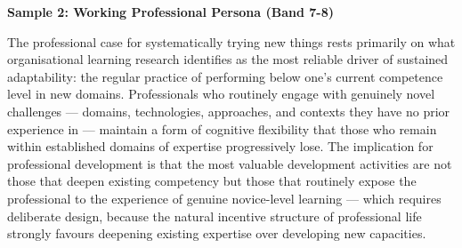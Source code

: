 \textbf{Sample 2: Working Professional Persona (Band 7-8)}

The professional case for systematically trying new things rests primarily on what organisational learning research identifies as the most reliable driver of sustained adaptability: the regular practice of performing below one's current competence level in new domains. Professionals who routinely engage with genuinely novel challenges — domains, technologies, approaches, and contexts they have no prior experience in — maintain a form of cognitive flexibility that those who remain within established domains of expertise progressively lose. The implication for professional development is that the most valuable development activities are not those that deepen existing competency but those that routinely expose the professional to the experience of genuine novice-level learning — which requires deliberate design, because the natural incentive structure of professional life strongly favours deepening existing expertise over developing new capacities.

\separator


